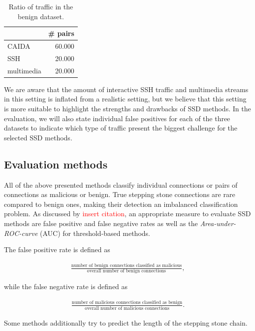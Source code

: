 \documentclass[runningheads]{llncs}\usepackage[]{graphicx}\usepackage[]{color}
\begin{document}
\begin{table}
\centering
\begin{tabular}{l|r}
&\# pairs \\ \hline
CAIDA& 60.000\\ \hline
SSH& 20.000 \\ \hline
multimedia& 20.000 \\ \hline
\end{tabular}
\caption{Ratio of traffic in the benign dataset.}\label{Tab:Benigndata}
\end{table}

We are aware that the amount of interactive SSH traffic and multimedia streams in this setting is inflated from a realistic setting, but we believe that this setting is more suitable to highlight the strengths and drawbacks of SSD methods. In the evaluation, we will also state individual false positives for each of the three datasets to indicate which type of traffic present the biggest challenge for the selected SSD methods.  


\subsection{Evaluation methods}

All of the above presented methods classify individual connections or pairs of connections as malicious or benign. True stepping stone connections are rare compared to benign ones, making their detection an imbalanced classification problem. As discussed by \textcolor{red}{insert citation}, an appropriate measure to evaluate SSD methods are false positive and false negative rates as well as the \textit{Area-under-ROC-curve} (AUC) for threshold-based methods.

The false positive rate is defined as

\begin{align*}
\frac{\text{number of benign connections classified as malicious}}{\text{overall number of benign connections}},
\end{align*}

while the false negative rate is defined as

\begin{align*}
\frac{\text{number of malicious connections classified as benign}}{\text{overall number of malicious connections}}.
\end{align*}

Some methods additionally try to predict the length of the stepping stone chain.
\end{document}
